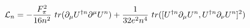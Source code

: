 \begin{equation}
{\cal{L}}_n= - \frac{F_\pi^2}{16 n^2}~ tr(\partial_\mu U^{\dag n} \partial^\mu U^n) + \frac{1}{32e^2n^4}~tr([U^{\dag n} \partial_\mu U^n, U^{\dag n} \partial_\nu U^n]^2)      \label{eq:ln}
\end{equation}

